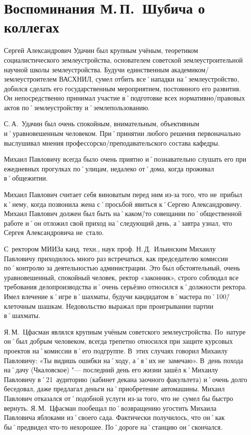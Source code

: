 ﻿\chapter{Воспоминания М.\,П.~Шубича о коллегах}


Сергей Александрович Удачин был крупным учёным, теоретиком социалистического землеустройства, основателем советской землеустроительной научной школы землеустройства. Будучи единственным академиком\-/землеустроителем ВАСХНИЛ, сумел отбить все˚нападки на˚землеустройство, добился сделать его государственным мероприятием, постоянного его развития. Он непосредственно принимал участие в˚подготовке всех нормативно\-/правовых актов по˚землеустройству и˚землепользованию. 

С.\,А.~Удачин был очень спокойным, внимательным, объективным и˚уравновешенным человеком. При˚принятии любого решения первоначально выслушивал мнения профессорско\-/преподавательского состава кафедры. 

Михаил Павловичу всегда было очень приятно и˚познавательно слушать его при ежедневных прогулках по˚улицам, недалеко от˚дома, когда проживал в˚общежитии.

Михаил Павлович считает себя виноватым перед ним из-за того, что не~прибыл к˚нему, когда позвонила жена с˚просьбой явиться к˚Сергею Александровичу. Михаил Павлович должен был быть на˚каком\=/то совещании по˚общественной работе и˚он отложил свой приход на˚следующий день, а˚завтра узнал, что Сергея Александровича не~стало.

С~ректором МИИЗа канд. техн., наук проф. Н.\,Д.~Ильинским Михаилу Павловичу приходилось много раз встречаться, как председателю комиссии по˚контролю за  деятельностью администрации. Это был обстоятельный, очень уравновешенный, спокойный человек, ректор «законник», строго соблюдал все требования делопроизводства и˚очень серьёзно относился к˚должности ректора. Имел влечение к˚игре в˚шахматы, будучи кандидатом в˚мастера по˚100\=/клеточным шашкам. Недовольство выражал при проигрывании партии в˚шахматы.

Я.\,М.~Цфасман являлся крупным учёным советского землеустройства. По~натуре он˚был добрым человеком, всегда трепетно относился при защите курсовых проектов на˚комиссии в˚его подгруппе. В~этих случаях говорил Михаилу Павловичу: «Ты видишь ошибки на˚ходу, а˚я˚их не~замечаю». В~день похода на˚дачу (Чкаловское) "--- последний день его жизни зашёл к˚Михаилу Павловичу в˚21~аудиторию (кабинет декана заочного факультета) и˚очень долго беседовал, даже предлагал деньги на˚приобретение автомашины. Михаил Павлович отказался от˚подобной услуги из-за того, что не~сумел бы быстро вернуть. Я.\,М.~Цфасман пообещал по˚возвращению угостить Михаила Павловича яблоками из˚своего сада. Фактически получилось, что он˚как бы˚предвидел что-то нехорошее. По˚дороге на˚станцию он˚скончался.

